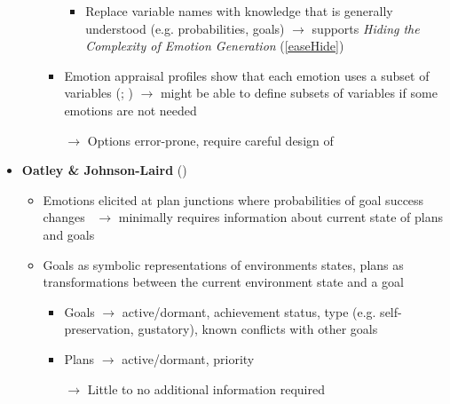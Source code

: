 \begin{itemize}
\begin{itemize}
\begin{itemize}
\begin{itemize}
                \item Replace variable names with knowledge that is generally
                understood (e.g. probabilities, goals) $\rightarrow$ supports
                \textit{Hiding the Complexity of Emotion Generation}
                (\ref{easeHide})
            \end{itemize}

            \item Emotion appraisal profiles show that each emotion uses a
            subset of variables (;
            ) $\rightarrow$ might be able to define
            subsets of variables if some emotions are not needed

            \item [$\rightarrow$] Options error-prone, require careful design
            of \progname{}
        \end{itemize}
    \end{itemize}

    \item \textbf{Oatley \& Johnson-Laird} (\strong)
    \begin{itemize}
        \item Emotions elicited at plan junctions where probabilities of goal
        success changes~\citep[p.~98]{oatley1992best} $\rightarrow$ minimally
        requires information about current state of plans and goals

        \item Goals as symbolic  representations of environments states,
        plans as transformations between the current environment state and
        a goal~\citep[p.~30]{oatley1987towards}
        \begin{itemize}
            \item Goals $\rightarrow$ active/dormant, achievement status, type
            (e.g. self-preservation, gustatory), known conflicts with other
            goals

            \item Plans $\rightarrow$ active/dormant, priority

            \item [$\rightarrow$] Little to no additional information required
        \end{itemize}
    \end{itemize}
\end{itemize}

